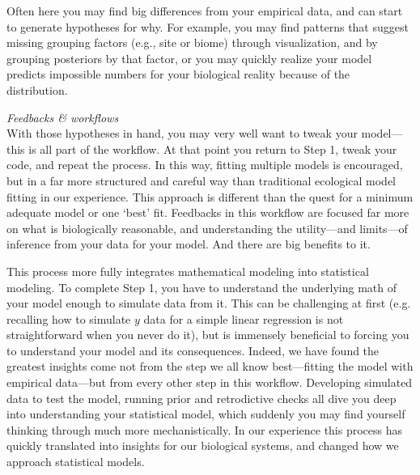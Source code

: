 \documentclass[11pt]{article}
\begin{document}
{%
Often here you may find big differences from your empirical data, and can start to generate hypotheses for why. For example, you may find patterns that suggest missing grouping factors (e.g., site or biome) through visualization, and by grouping posteriors by that factor, or you may quickly realize your model predicts impossible numbers for your biological reality because of the distribution. 

\emph{Feedbacks \& workflows}\\
With those hypotheses in hand, you may very well want to tweak your model---this is all part of the workflow. At that point you return to Step 1, tweak your code, and repeat the process. In this way, fitting multiple models is encouraged, but in a far more structured and careful way than traditional ecological model fitting in our experience. This approach is different than the quest for a minimum adequate model or one `best' fit. Feedbacks in this workflow are focused far more on what is biologically reasonable, and understanding the utility---and limits---of inference from your data for your model.  And there are big benefits to it. 

This process more fully integrates mathematical modeling into statistical modeling. To complete Step 1, you have to understand the underlying math of your model enough to simulate data from it. This can be challenging at first (e.g. recalling how to simulate $y$ data for a simple linear regression is not straightforward when you never do it), but is immensely beneficial to forcing you to understand your model and its consequences. Indeed, we have found the greatest insights come not from the step we all know best---fitting the model with empirical data---but from every other step in this workflow. Developing simulated data to test the model, running prior and retrodictive checks all dive you deep into understanding your statistical model, which suddenly you may find yourself thinking through much more mechanistically. In our experience this process has quickly translated into insights for our biological systems, and changed how we approach statistical models. %

}
\end{document}

